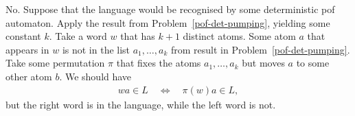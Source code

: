 {No. Suppose that the language would be recognised by some deterministic pof automaton. 
Apply the result from Problem~\ref{pof-det-pumping}, yielding some constant $k$. Take a word $w$ that has $k+1$ distinct atoms. Some atom $a$  that appears in $w$ is not in the list $a_1,\ldots,a_k$ from result in Problem~\ref{pof-det-pumping}. Take some permutation $\pi$ that fixes the atoms $a_1,\ldots, a_k$ but moves $a$ to some other atom $b$. We should have 
\begin{align*}
wa \in L \quad \Leftrightarrow \quad \pi(w)a \in L,
\end{align*}
but the right word is in the language, while the left word is not. 
}




